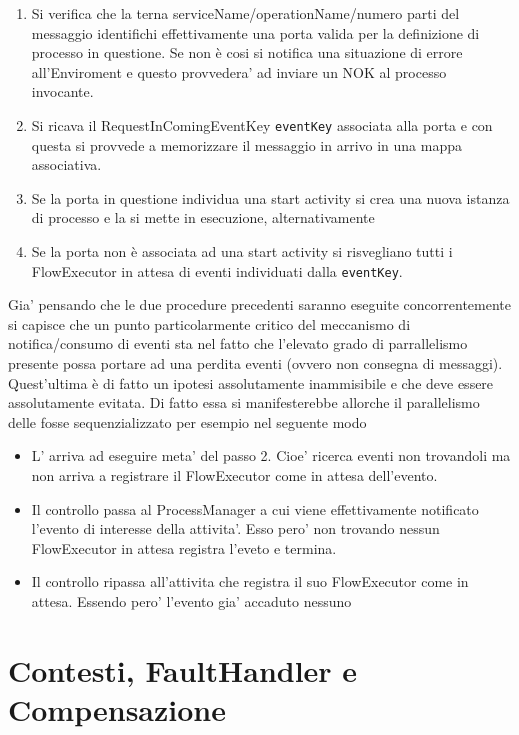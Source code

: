 \begin{enumerate}
  \item Si verifica che la terna serviceName/operationName/numero parti del
  messaggio identifichi effettivamente una porta valida per la definizione 
  di processo in questione. Se non \`e cosi si notifica una
  situazione di errore all'Enviroment e questo provvedera' ad inviare un NOK al
  processo invocante.
 
 \item Si ricava il RequestInComingEventKey \texttt{eventKey} associata alla
 porta e con questa si provvede a memorizzare il messaggio in arrivo in una mappa associativa.
 
 \item Se la porta in questione individua una start activity si crea una nuova
 istanza di processo e la si mette in esecuzione, alternativamente 
 
 \item Se la porta non \`e associata ad una start activity si risvegliano tutti
 i FlowExecutor in attesa di eventi individuati dalla \texttt{eventKey}.
\end{enumerate}

Gia' pensando che le due procedure precedenti saranno eseguite concorrentemente
si capisce che un punto particolarmente critico del meccanismo di
notifica/consumo di eventi sta nel fatto che l'elevato grado di parrallelismo
presente possa portare ad una perdita eventi (ovvero non consegna di messaggi).
Quest'ultima \`e di fatto un ipotesi assolutamente inammisibile e che deve essere
assolutamente evitata. Di fatto essa si manifesterebbe allorche il parallelismo
delle fosse sequenzializzato per esempio nel seguente modo

\begin{itemize}
  \item L' arriva ad eseguire meta' del passo 2. Cioe'
  ricerca eventi non trovandoli ma non arriva a registrare il FlowExecutor come
  in attesa dell'evento.
  \item Il controllo passa al ProcessManager a cui viene effettivamente
  notificato l'evento di interesse della attivita'. Esso pero' non trovando
  nessun FlowExecutor in attesa registra l'eveto e termina.
  \item Il controllo ripassa all'attivita che registra il suo FlowExecutor come
  in attesa. Essendo pero' l'evento gia' accaduto nessuno 
\end{itemize}

\section{Contesti, FaultHandler e Compensazione}



